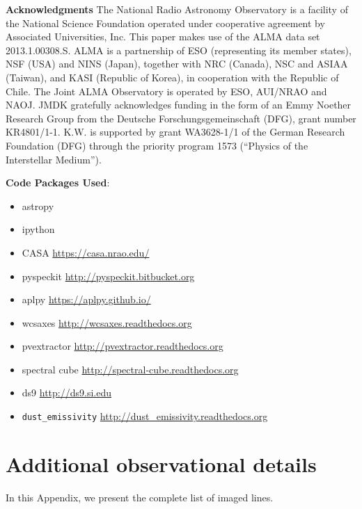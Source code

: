 \documentclass{emulateapj}
\begin{document}
\textbf{Acknowledgments}
The National Radio Astronomy Observatory is a facility of the National Science
Foundation operated under cooperative agreement by Associated Universities,
Inc.
This paper makes use of the ALMA data set 2013.1.00308.S.
ALMA is a partnership of ESO (representing its member states), NSF (USA) and
NINS (Japan), together with NRC (Canada), NSC and ASIAA (Taiwan), and KASI
(Republic of Korea), in cooperation with the Republic of Chile. The Joint ALMA
Observatory is operated by ESO, AUI/NRAO and NAOJ.
JMDK gratefully acknowledges funding in the form of an
Emmy Noether Research Group from the Deutsche Forschungsgemeinschaft (DFG),
grant number KR4801/1-1.
K.W. is supported by grant WA3628-1/1 of the German Research Foundation (DFG)
through the priority program 1573 (``Physics of the Interstellar Medium'').

\textbf{Code Packages Used}:

\begin{itemize}
    \item astropy \citep{Astropy-Collaboration2013a}
    \item ipython \citep{Perez2007a}
    \item CASA \url{https://casa.nrao.edu/}
    \item pyspeckit \url{http://pyspeckit.bitbucket.org} \citet{Ginsburg2011c}
    \item aplpy \url{https://aplpy.github.io/}
    \item wcsaxes \url{http://wcsaxes.readthedocs.org}
    \item pvextractor \url{http://pvextractor.readthedocs.org}
    \item spectral cube \url{http://spectral-cube.readthedocs.org}
    \item ds9 \url{http://ds9.si.edu}
    \item \texttt{dust\_emissivity} \url{http://dust\_emissivity.readthedocs.org}
\end{itemize}




\appendix

\section{Additional observational details}
In this Appendix, we present the complete list of imaged lines.
\end{document}
